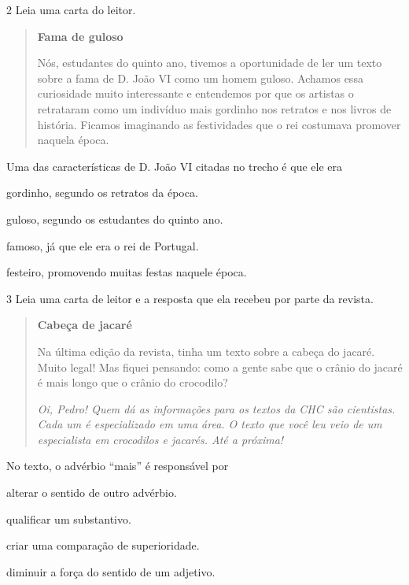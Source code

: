 \num{2} Leia uma carta do leitor.

\begin{quote}
\textbf{Fama de guloso}

Nós, estudantes do quinto ano, tivemos a oportunidade de ler um texto sobre a fama de D. João VI como um homem guloso. Achamos essa curiosidade muito interessante e entendemos por que os artistas o retrataram como um indivíduo mais gordinho nos retratos e nos livros de história. Ficamos imaginando as festividades que o rei costumava promover naquela época.

\end{quote}

Uma das características de D. João VI citadas no trecho é que ele era

\begin{escolha}
\item gordinho, segundo os retratos da época.

\item guloso, segundo os estudantes do quinto ano.

\item famoso, já que ele era o rei de Portugal.

\item festeiro, promovendo muitas festas naquele época.
\end{escolha}



\num{3} Leia uma carta de leitor e a resposta que ela recebeu por parte da revista.

\begin{quote}
\textbf{Cabeça de jacaré}

Na última edição da revista, tinha um texto sobre a cabeça do jacaré.
Muito legal! Mas fiquei pensando: como a gente sabe que o crânio do jacaré
é mais longo que o crânio do crocodilo?

\textit{Oi, Pedro! Quem dá as informações para os textos da CHC são cientistas.
Cada um é especializado em uma área. O texto que você leu veio de um
especialista em crocodilos e jacarés. Até a próxima!}

\end{quote}

No texto, o advérbio ``mais'' é responsável por

\begin{escolha}
\item alterar o sentido de outro advérbio.

\item qualificar um substantivo.

\item criar uma comparação de superioridade.

\item diminuir a força do sentido de um adjetivo.
\end{escolha}


